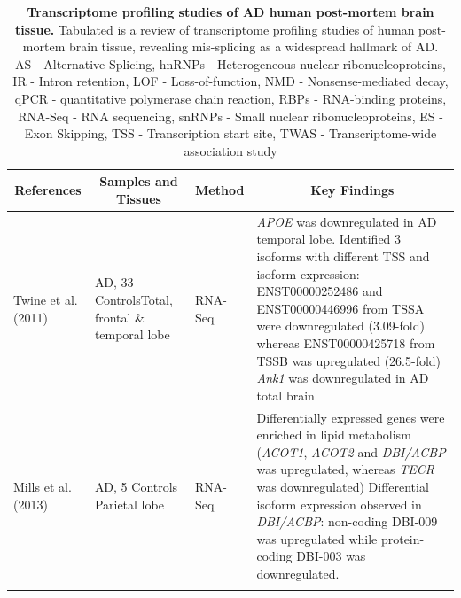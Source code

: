 \begin{landscape}
	\small %
	\setlength\tabcolsep{2pt} %
	\renewcommand{\arraystretch}{1}
	\begin{longtable}[c]{p{3cm}p{4cm}p{3cm}p{16cm}}
		\caption[Transcriptome profiling studies of AD human post-mortem brain tissue]%
		{\textbf{Transcriptome profiling studies of AD human post-mortem brain tissue.} Tabulated is a review of transcriptome profiling studies of human post-mortem brain tissue, revealing mis-splicing as a widespread hallmark of AD. \newline AS - Alternative Splicing, hnRNPs - Heterogeneous nuclear ribonucleoproteins, IR - Intron retention, LOF - Loss-of-function, NMD - Nonsense-mediated decay, qPCR - quantitative polymerase chain reaction, RBPs - RNA-binding proteins, RNA-Seq - RNA sequencing, snRNPs - Small nuclear ribonucleoproteins, ES - Exon Skipping, TSS - Transcription start site, TWAS - Transcriptome-wide association study}
		\label{tab: AS_ADHuman_studies}\\
		
		\toprule
		\multicolumn{1}{c}{References} &
		\multicolumn{1}{c}{Samples and Tissues} &
		\multicolumn{1}{c}{Method} &
		\multicolumn{1}{c}{Key Findings} \\* \midrule
		\endfirsthead
		\endhead
		\bottomrule
		\endfoot
		\endlastfoot
		\centering Twine et al. (2011)\cite{Twine2011} &
		\centering 3 AD, 33 Controls\newline Total, frontal \& temporal lobe &
		\centering RNA-Seq &
		\tabitem \textit{APOE} was downregulated in AD temporal lobe. Identified 3 isoforms with different TSS and isoform expression: ENST00000252486 and ENST00000446996 from TSSA were downregulated (3.09-fold) whereas ENST00000425718 from TSSB was upregulated (26.5-fold) \newline
		\tabitem \textit{Ank1} was downregulated in AD total brain \\
		\hdashline[0.5pt/5pt]
		
		\centering Mills et al. (2013)\cite{Mills2013} &
		\centering 5 AD, 5 Controls \newline Parietal lobe &
		\centering RNA-Seq &
		\tabitem Differentially expressed genes were enriched in lipid metabolism (\textit{ACOT1}, \textit{ACOT2} and  \textit{DBI/ACBP} was upregulated, whereas \textit{TECR} was downregulated) \newline
		\tabitem Differential isoform expression observed in \textit{DBI/ACBP}: non-coding DBI-009 was upregulated while protein-coding DBI-003 was downregulated. \\
		\hdashline[0.5pt/5pt]
		

\end{longtable}
\end{landscape}
